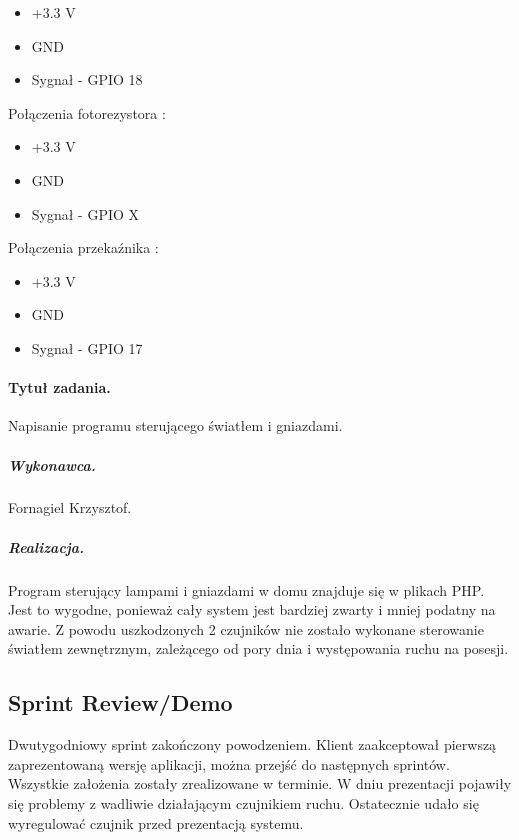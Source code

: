	\begin{itemize}
		\item +3.3 V
		\item GND
		\item Sygnał - GPIO 18
	\end{itemize}
	Połączenia fotorezystora :
	\begin{itemize}
		\item +3.3 V
		\item GND
		\item Sygnał - GPIO X
	\end{itemize}
	Połączenia przekaźnika : 
	\begin{itemize}
		\item +3.3 V
		\item GND
		\item Sygnał - GPIO 17
	\end{itemize}
	
	\paragraph{Tytuł zadania.} Napisanie programu sterującego światłem i gniazdami.
	\subparagraph{Wykonawca.} Fornagiel Krzysztof.
	\subparagraph{Realizacja.} Program sterujący lampami i gniazdami w domu znajduje się w plikach PHP. Jest to wygodne, ponieważ cały system jest bardziej zwarty i mniej podatny na awarie. Z powodu uszkodzonych 2 czujników nie zostało wykonane sterowanie światłem zewnętrznym, zależącego od pory dnia i występowania ruchu na posesji.

	
	\subsection{Sprint Review/Demo}
	Dwutygodniowy sprint zakończony powodzeniem. Klient zaakceptował pierwszą zaprezentowaną wersję aplikacji, można przejść do następnych sprintów. Wszystkie założenia zostały zrealizowane w terminie. W dniu prezentacji pojawiły się problemy z wadliwie działającym czujnikiem ruchu. Ostatecznie udało się wyregulować czujnik przed prezentacją systemu.
	